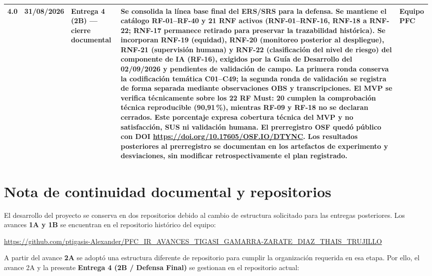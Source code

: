 \documentclass[11pt,a4paper]{article}
\begin{document}
\begin{longtable}{@{}p{1.1cm}p{1.6cm}p{2.1cm}p{6.4cm}p{2.7cm}@{}}
		4.0 & 31/08/2026 & Entrega 4 (2B) --- cierre documental & Se consolida la línea base final del ERS/SRS para la defensa. Se mantiene el catálogo RF-01--RF-40 y 21 RNF activos (RNF-01--RNF-16, RNF-18 a RNF-22; RNF-17 permanece retirado para preservar la trazabilidad histórica). Se incorporan RNF-19 (equidad), RNF-20 (monitoreo posterior al despliegue), RNF-21 (supervisión humana) y RNF-22 (clasificación del nivel de riesgo) del componente de IA (RF-16), exigidos por la Guía de Desarrollo del 02/09/2026 y pendientes de validación de campo. La primera ronda conserva la codificación temática C01--C49; la segunda ronda de validación se registra de forma separada mediante observaciones OBS y transcripciones. El MVP se verifica técnicamente sobre los 22 RF Must: 20 cumplen la comprobación técnica reproducible (90,91\,\%), mientras RF-09 y RF-18 no se declaran cerrados. Este porcentaje expresa cobertura técnica del MVP y no satisfacción, SUS ni validación humana. El prerregistro OSF quedó público con DOI \url{https://doi.org/10.17605/OSF.IO/DTYNC}. Los resultados posteriores al prerregistro se documentan en los artefactos de experimento y desviaciones, sin modificar retrospectivamente el plan registrado. & Equipo PFC \\
		\bottomrule
	\end{longtable}
	
	
	\tableofcontents
	\clearpage
	
	
	
	\section*{Nota de continuidad documental y repositorios}
	
	El desarrollo del proyecto se conserva en dos repositorios debido al cambio de estructura solicitado para las entregas posteriores. Los avances \textbf{1A y 1B} se encuentran en el repositorio histórico del equipo:
	
	\begin{center}
		\url{https://github.com/ptigasis-Alexander/PFC_IR_AVANCES_TIGASI_GAMARRA-ZARATE_DIAZ_THAIS_TRUJILLO}
	\end{center}
	
	A partir del avance \textbf{2A} se adoptó una estructura diferente de repositorio para cumplir la organización requerida en esa etapa. Por ello, el avance 2A y la presente \textbf{Entrega 4 (2B / Defensa Final)} se gestionan en el repositorio actual:
	
\end{document}
